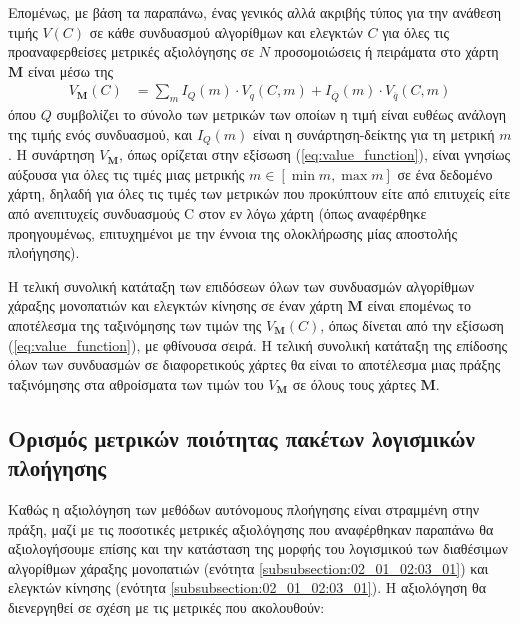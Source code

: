 Επομένως, με βάση τα παραπάνω, ένας γενικός αλλά ακριβής τύπος για την ανάθεση
τιμής $V(C)$ σε κάθε συνδυασμού αλγορίθμων και ελεγκτών $C$ για όλες τις
προαναφερθείσες μετρικές αξιολόγησης σε $N$ προσομοιώσεις ή πειράματα στο χάρτη
$\bm{M}$ είναι μέσω της
\begin{align}
  \label{eq:value_function}
  V_{\bm{M}}(C) &= \sum\limits_{m} I_Q(m) \cdot V_q(C,m) + I_{\overline{Q}}(m) \cdot V_{\overline{q}}(C,m)
\end{align}
όπου $Q$ συμβολίζει το σύνολο των μετρικών των οποίων η τιμή είναι ευθέως
ανάλογη της τιμής ενός συνδυασμού, και $I_Q(m)$ είναι η συνάρτηση-δείκτης για
τη μετρική $m$.  H συνάρτηση $V_{\bm{M}}$, όπως ορίζεται στην εξίσωση
(\ref{eq:value_function}), είναι γνησίως αύξουσα για όλες τις τιμές μιας
μετρικής $m \in [\min m, \max m]$ σε ένα δεδομένο χάρτη, δηλαδή για όλες τις
τιμές των μετρικών που προκύπτουν είτε από επιτυχείς είτε από ανεπιτυχείς
συνδυασμούς C στον εν λόγω χάρτη (όπως αναφέρθηκε προηγουμένως, επιτυχημένοι με
την έννοια της ολοκλήρωσης μίας αποστολής πλοήγησης).

Η τελική συνολική κατάταξη των επιδόσεων όλων των συνδυασμών αλγορίθμων χάραξης
μονοπατιών και ελεγκτών κίνησης σε έναν χάρτη $\bm{M}$ είναι επομένως το
αποτέλεσμα της ταξινόμησης των τιμών της $V_{\bm{M}}(C)$, όπως δίνεται από την
εξίσωση (\ref{eq:value_function}), με φθίνουσα σειρά. Η τελική συνολική
κατάταξη της επίδοσης όλων των συνδυασμών σε διαφορετικούς χάρτες θα είναι το
αποτέλεσμα μιας πράξης ταξινόμησης στα αθροίσματα των τιμών του $V_{\bm{M}}$ σε
όλους τους χάρτες $\bm{M}$.


\subsection{Ορισμός μετρικών ποιότητας πακέτων λογισμικών πλοήγησης}
\label{subsection:02_01_03:04}

Καθώς η αξιολόγηση των μεθόδων αυτόνομους πλοήγησης είναι στραμμένη στην πράξη,
μαζί με τις ποσοτικές μετρικές αξιολόγησης που αναφέρθηκαν παραπάνω θα
αξιολογήσουμε επίσης και την κατάσταση της μορφής του λογισμικού των διαθέσιμων
αλγορίθμων χάραξης μονοπατιών (ενότητα \ref{subsubsection:02_01_02:03_01})
και ελεγκτών κίνησης (ενότητα \ref{subsubsection:02_01_02:03_01}). Η αξιολόγηση
θα διενεργηθεί σε σχέση με τις μετρικές που ακολουθούν:

